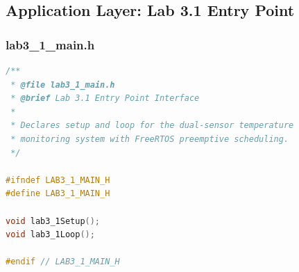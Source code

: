 
\subsection{Application Layer: Lab 3.1 Entry Point}

\subsubsection{lab3\_1\_main.h}
\begin{lstlisting}[language=C++, caption=lab3\_1\_main.h --- Lab 3.1 Entry Point Interface]
/**
 * @file lab3_1_main.h
 * @brief Lab 3.1 Entry Point Interface
 *
 * Declares setup and loop for the dual-sensor temperature
 * monitoring system with FreeRTOS preemptive scheduling.
 */

#ifndef LAB3_1_MAIN_H
#define LAB3_1_MAIN_H

void lab3_1Setup();
void lab3_1Loop();

#endif // LAB3_1_MAIN_H
\end{lstlisting}

